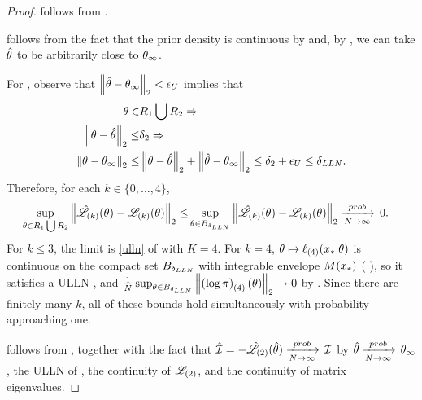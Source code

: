 \begin{lem}
\begin{proof}
 follows from .

 follows from the fact that the prior density is
continuous by   and,
by , we can take
$\hat\theta$ to be arbitrarily close to $\theta_{\infty}$.

For , observe that $\left\Vert \hat\theta - \theta_{\infty}\right\Vert_2 < \epsilon_U$
implies that
%
\begin{align*}
%
\theta \in& R_1 \bigcup R_2 \Rightarrow\\
\norm{\theta - \thetahat}_2 \le& \delta_2 \Rightarrow\\
\norm{\theta - \thetatrue}_2 \le&
    \norm{\theta - \thetahat}_2 + \norm{\thetahat - \thetatrue}_2
\le \delta_2 + \epsilon_U \le \deltaulln.
%
\end{align*}
%
Therefore, for each $k \in \{0, \ldots, 4\}$,
%
\begin{align*}
%
\sup_{\theta \in R_1 \bigcup R_2}
    \norm{\likhatk{k}(\theta) - \likk{k}(\theta)}_2 \le&
\sup_{\theta \in \thetaball{\deltaulln}}
    \norm{\likhatk{k}(\theta) - \likk{k}(\theta)}_2 \plim 0.
%
\end{align*}
%
For $k \le 3$, the limit is \eqref{ulln} of  with $K = 4$.  For
$k = 4$, $\theta \mapsto \ell_{(4)}(x_{*} \vert \theta)$ is continuous on the
compact set $B_{\delta_{LLN}}$ with integrable envelope $M(x_{*})$
( ), so it satisfies a
ULLN \citep[Example 19.8]{van:2000:asymptotic}, and
$\frac{1}{N} \sup_{\theta \in B_{\delta_{LLN}}}
\left\Vert \left(\log\pi\right)_{(4)}(\theta)\right\Vert_2 \rightarrow 0$ by 
.  Since there are finitely many $k$, all of these bounds
hold simultaneously with probability approaching one.



 follows from , together with
the fact that $\hat{\mathcal{I}} = -\hat{\mathscr{L}}_{(2)}(\hat\theta) \xrightarrow[N\rightarrow\infty]{prob}\, \mathcal{I}$ by
$\hat\theta \xrightarrow[N\rightarrow\infty]{prob}\, \theta_{\infty}$, the ULLN of , the continuity of
$\mathscr{L}_{(2)}$, and the continuity of matrix eigenvalues.



\end{proof}
\end{lem}

